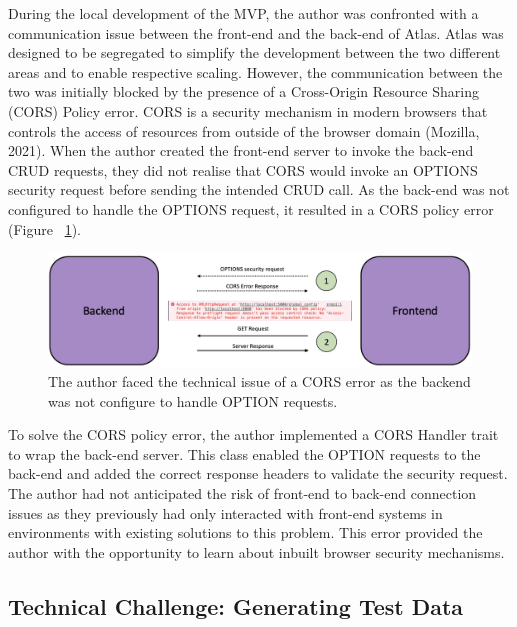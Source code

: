 \documentclass{article}
\begin{document}
During the local development of the MVP, the author was confronted with a communication issue between the front-end and the back-end of Atlas. Atlas was designed to be segregated to simplify the development between the two different areas and to enable respective scaling. However, the communication between the two was initially blocked by the presence of a Cross-Origin Resource Sharing (CORS) Policy error. CORS is a security mechanism in modern browsers that controls the access of resources from outside of the browser domain (Mozilla, 2021). When the author created the front-end server to invoke the back-end CRUD requests, they did not realise that CORS would invoke an OPTIONS security request before sending the intended CRUD call. As the back-end was not configured to handle the OPTIONS request, it resulted in a CORS policy error (Figure ~\ref{fig:cors}).

\begin{figure}[!h]
  \centering
      \includegraphics[width=1\textwidth]{images/cors.png}
  \caption{The author faced the technical issue of a CORS error as the backend was not configure to handle OPTION requests.}
  \label{fig:cors}
\end{figure}

To solve the CORS policy error, the author implemented a CORS Handler trait to wrap the back-end server. This class enabled the OPTION requests to the back-end and added the correct response headers to validate the security request. The author had not anticipated the risk of front-end to back-end connection issues as they previously had only interacted with front-end systems in environments with existing solutions to this problem. This error provided the author with the opportunity to learn about inbuilt browser security mechanisms. 

\clearpage

\subsection{Technical Challenge: Generating Test Data}
\end{document}
